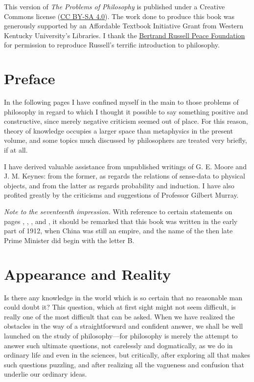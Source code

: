 \documentclass[oneside,letterpaper,12pt]{book}
\begin{document}
This version of \emph{The Problems of Philosophy} is published under a Creative Commons license (\href{https://creativecommons.org/licenses/by-sa/4.0/}{CC BY-SA 4.0}). The work done to produce this book was generously supported by an Affordable Textbook Initiative Grant from Western Kentucky University's Libraries. I thank the \href{http://www.russfound.org/}{Bertrand Russell Peace Foundation} for permission to reproduce Russell's terrific introduction to philosophy.

\hypertarget{preface}{%
	\chapter*{Preface}\label{preface}}

In the following pages I have confined myself in the main to those
problems of philosophy in regard to which I thought it possible to say
something positive and constructive, since merely negative criticism
seemed out of place. For this reason, theory of knowledge occupies a
larger space than metaphysics in the present volume, and some topics
much discussed by philosophers are treated very briefly, if at all.

I have derived valuable assistance from unpublished writings of G. E.
Moore and J. M. Keynes: from the former, as regards the relations of
sense-data to physical objects, and from the latter as regards
probability and induction. I have also profited greatly by the
criticisms and suggestions of Professor Gilbert Murray.

\emph{Note to the seventeenth impression.} With reference to certain 
statements on pages \pageref{China1}, \pageref{China2}, \pageref{Balfour1}, 
and \pageref{Balfour2}, it should be remarked that this book was 
written in the early part of 1912, when China was still an empire, and 
the name of the then late Prime Minister did begin with the letter B.

\tableofcontents

\mainmatter
\chapter{Appearance and Reality}\label{chapter-i.-appearance-and-reality}
Is there any knowledge in the world which is so certain that no
reasonable man could doubt it? This question, which at first sight might
not seem difficult, is really one of the most difficult that can be
asked. When we have realized the obstacles in the way of a
straightforward and confident answer, we shall be well launched on the
study of philosophy---for philosophy is merely the attempt to answer
such ultimate questions, not carelessly and dogmatically, as we do in
ordinary life and even in the sciences, but critically,\label{reasons} after exploring
all that makes such questions puzzling, and after realizing all the
vagueness and confusion that underlie our ordinary ideas.
\end{document}
